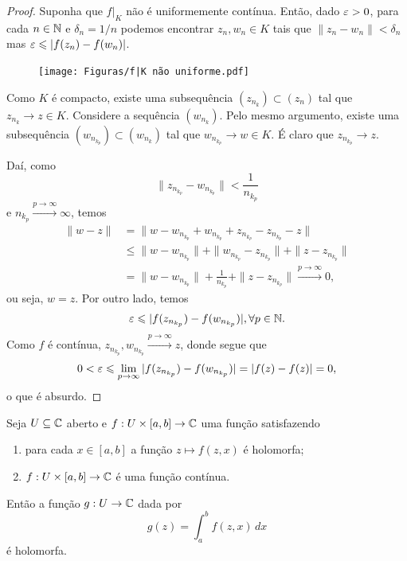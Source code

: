 \begin{proof}
Suponha que $f\big|_K$ não é uniformemente contínua. Então, dado $\varepsilon>0$, para
cada $n\in\mathbb{N}$ e $\delta_n = 1/n$ podemos encontrar $z_n, w_n\in K$ tais que
$\|z_n - w_n\| < \delta_n$ mas $\varepsilon\leqslant |f(z_n) - f(w_n)|$.
%
\begin{figure}[H]\centering
    \texttt{[image: Figuras/f|K não uniforme.pdf]}
\end{figure}
%
Como $K$ é compacto, existe uma subsequência $(z_{n_k})\subset (z_n)$ tal que
$z_{n_k} \to z\in K$. Considere a sequência $(w_{n_k})$. Pelo mesmo argumento, existe
uma subsequência $(w_{n_{k_p}})\subset (w_{n_k})$ tal que
$w_{n_{k_p}} \to w\in K$. É claro que $z_{n_{k_p}} \to z$.

Daí, como
%
\[
\| z_{n_{k_p}} - w_{n_{k_p}} \| < \frac{1}{n_{k_p}}
\]
%
e $n_{k_p} \xrightarrow{p\to\infty} \infty$, temos
%
\begin{align*}
    \| w - z \| &= \| w - w_{n_{k_p}} + w_{n_{k_p}} + z_{n_{k_p}} - z_{n_{k_p}} - z \| \\
                &\leq \| w - w_{n_{k_p}} \| + \| w_{n_{k_p}} - z_{n_{k_p}} \| + \| z - z_{n_{k_p}} \|\\
                &= \| w - w_{n_{k_p}} \| + \frac{1}{n_{k_p}} + \| z - z_{n_{k_p}} \|
                \xrightarrow{p\to\infty} 0,
\end{align*}
%
ou seja, $w = z$. Por outro lado, temos
%
\[
\varepsilon \leqslant |f(z_{n_{k_p}}) - f(w_{n_{k_p}})|, \forall p\in\mathbb{N}.
\]
%
Como $f$ é contínua, $z_{n_{k_p}}, w_{n_{k_p}} \xrightarrow{p\to\infty} z$, donde segue que
%
\[
0 < \varepsilon \leqslant \lim_{p\to\infty} |f(z_{n_{k_p}}) - f(w_{n_{k_p}})| = |f(z) - f(z)| = 0,
\]
%
o que é absurdo.
\end{proof}
%
\begin{teorema}
Seja $U\subseteq\mathbb{C}$ aberto e $f:U\times[a,b]\to\mathbb{C}$ uma função satisfazendo
%
\begin{enumerate}[1)]
    \item para cada $x\in[a,b]$ a função $z\mapsto f(z,x)$ é holomorfa;
    \item $f:U\times[a,b]\to\mathbb{C}$ é uma função contínua.
\end{enumerate}
%
Então a função $g:U\to\mathbb{C}$ dada por
%
\[
g(z) = \int_a^b f(z,x) \, dx
\]
%
é holomorfa.
\end{teorema}
%
